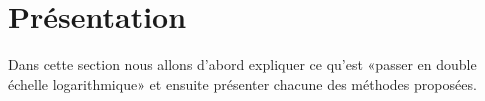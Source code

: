 \section{Présentation}
\label{sec:approx-lin/pres}

Dans cette section nous allons d'abord expliquer ce qu'est
«passer en double échelle logarithmique» et ensuite présenter
chacune des méthodes proposées.





